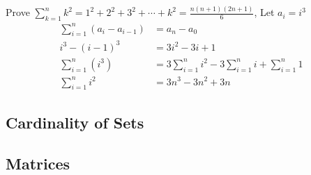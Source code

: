 \documentclass{article}
\begin{document}
Prove $ \sum_{k = 1}^{n} k^2 = 1^2 + 2^2 + 3^2 + \cdots + k^2 = \frac{ n \left( n + 1 \right) \left( 2n + 1 \right) }{ 6 } $, Let $ a_i = i^3 $
\begin{align*}
	\sum_{i = 1}^{n} \left( a_{i} - a_{i - 1} \right) & = a_{n} - a_0                                                        \\
	i^3 - (i - 1)^{3}                                 & = 3i^2 - 3i + 1                                                      \\
	\sum_{i = 1}^{n} \left( i^3 \right)               & = 3 \sum_{i = 1}^{n} i^2 - 3 \sum_{i = 1}^{n} i + \sum_{i = 1}^{n} 1 \\
	\sum_{i = 1}^{n} i^2                              & = 3n^3 - 3n^2 + 3n
\end{align*}

\subsection{Cardinality of Sets}

\subsection{Matrices}
\end{document}
